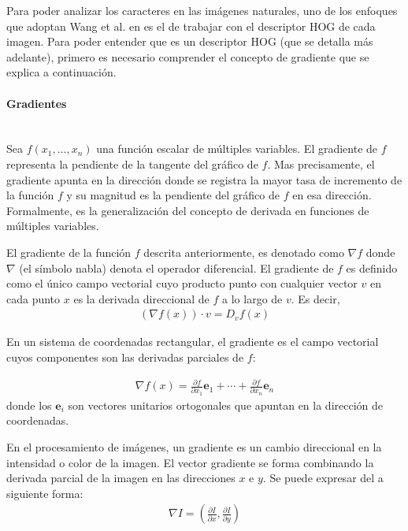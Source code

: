 	Para poder analizar los caracteres en las imágenes naturales, uno de los enfoques que adoptan Wang et al. en \cite{wang} es el de trabajar con el descriptor HOG de cada imagen. Para poder entender que es un descriptor HOG (que se detalla más adelante), primero es necesario comprender el concepto de gradiente que se explica a continuación.
	
\paragraph{Gradientes} ~\\

	Sea $f(x_1,\dots,x_n)$ una función escalar de múltiples variables. El gradiente de $f$ representa la pendiente de la tangente del gráfico de $f$.  Mas precisamente, el gradiente apunta en la dirección donde se registra la mayor tasa de incremento de la función $f$ y su magnitud es la pendiente del gráfico de $f$ en esa dirección. Formalmente, es la generalización del concepto de derivada en funciones de múltiples variables.
		
	El gradiente de la función $f$ descrita anteriormente, es denotado como $\nabla f$ donde $\nabla$ (el símbolo nabla) denota el operador diferencial. El gradiente de $f$ es definido como el único campo vectorial cuyo producto punto con cualquier vector $v$ en cada punto $x$ es la derivada direccional de $f$ a lo largo de $v$. Es decir,
		 \begin{align*}
		 	(\nabla f(x))\cdot v = D_v f(x)
		 \end{align*}
		 
	En un sistema de coordenadas rectangular, el gradiente es el campo vectorial cuyos componentes son las derivadas parciales de $f$:
		 
		 \begin{align*}
		 	\nabla f(x) = \frac{\partial f}{\partial x_1}\mathbf{e}_1 + \cdots + \frac{\partial f}{\partial x_n }\mathbf{e}_n
		 \end{align*}
	donde los $\mathbf{e}_i$ son vectores unitarios ortogonales que apuntan en la dirección de coordenadas.

	En el procesamiento de imágenes, un gradiente es un cambio direccional en la intensidad o color de la imagen. El vector gradiente se forma combinando la derivada parcial de la imagen en las direcciones $x$ e $y$. Se puede expresar del a siguiente forma:
		\begin{align}
			\nabla I = \left( \frac{\partial I}{\partial x} , \frac{\partial I}{\partial y} \right)
		\end{align}	
		
